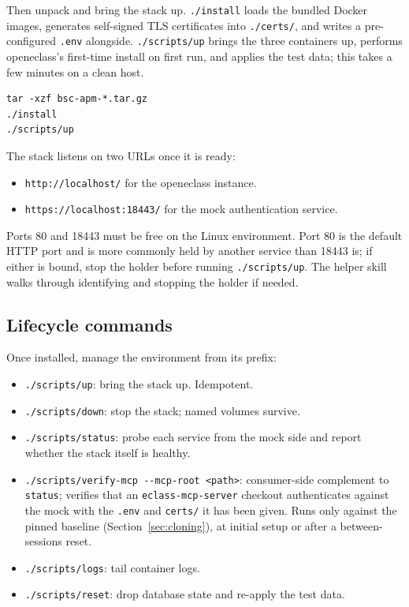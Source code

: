 \documentclass[11pt, a4paper]{article}
\begin{document}
Then unpack and bring the stack up. \texttt{./install} loads the bundled Docker images, generates self-signed TLS certificates into \texttt{./certs/}, and writes a pre-configured \texttt{.env} alongside. \texttt{./scripts/up} brings the three containers up, performs openeclass's first-time install on first run, and applies the test data; this takes a few minutes on a clean host.

\begin{verbatim}
tar -xzf bsc-apm-*.tar.gz
./install
./scripts/up
\end{verbatim}

The stack listens on two URLs once it is ready:

\begin{itemize}
    \item \texttt{http://localhost/} for the openeclass instance.
    \item \texttt{https://localhost:18443/} for the mock authentication service.
\end{itemize}

Ports 80 and 18443 must be free on the Linux environment. Port 80 is the default HTTP port and is more commonly held by another service than 18443 is; if either is bound, stop the holder before running \texttt{./scripts/up}. The helper skill walks through identifying and stopping the holder if needed.

\subsection{Lifecycle commands}
\label{sec:env:lifecycle}

Once installed, manage the environment from its prefix:

\begin{itemize}
    \item \texttt{./scripts/up}: bring the stack up. Idempotent.
    \item \texttt{./scripts/down}: stop the stack; named volumes survive.
    \item \texttt{./scripts/status}: probe each service from the mock side and report whether the stack itself is healthy.
    \item \texttt{./scripts/verify-mcp -{}-mcp-root <path>}: consumer-side complement to \texttt{status}; verifies that an \texttt{eclass-mcp-server} checkout authenticates against the mock with the \texttt{.env} and \texttt{certs/} it has been given. Runs only against the pinned baseline (Section~\ref{sec:cloning}), at initial setup or after a between-sessions reset.
    \item \texttt{./scripts/logs}: tail container logs.
    \item \texttt{./scripts/reset}: drop database state and re-apply the test data.
\end{itemize}
\end{document}

